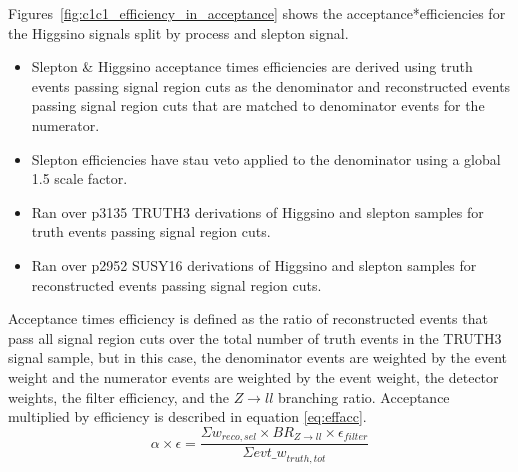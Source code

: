 Figures~\ref{fig:c1c1_efficiency_in_acceptance} shows
the acceptance*efficiencies for the Higgsino signals split by process and slepton signal.

\begin{itemize}
\item Slepton \& Higgsino acceptance times efficiencies are derived using truth events passing signal region cuts as the denominator and reconstructed events passing signal region cuts that are matched to denominator events for the numerator.
\item Slepton efficiencies have stau veto applied to the denominator using a global 1.5 scale factor.
\item Ran over p3135 TRUTH3 derivations of Higgsino and slepton samples for truth events passing signal region cuts.
\item Ran over p2952 SUSY16 derivations of Higgsino and slepton samples for reconstructed events passing signal region cuts.
\end{itemize}

Acceptance times efficiency is defined as the ratio of reconstructed events that pass all signal region cuts over the total number of truth events in the TRUTH3 signal sample, but in this case, the denominator events are weighted by the event weight and the numerator events are weighted by the event weight, the detector weights, the filter efficiency, and the $Z\rightarrow ll$ branching ratio.  Acceptance multiplied by efficiency is described in equation \ref{eq:effacc}.\\
\begin{equation}
    \alpha\times{\epsilon} = \frac{\Sigma \textit{w}_{reco,sel}\times{BR_{Z\rightarrow ll}}\times{\epsilon_{filter}}}{\Sigma \textit{evt\_w}_{truth, tot}}
\label{eq:effacc}
\end{equation}
\FloatBarrier

